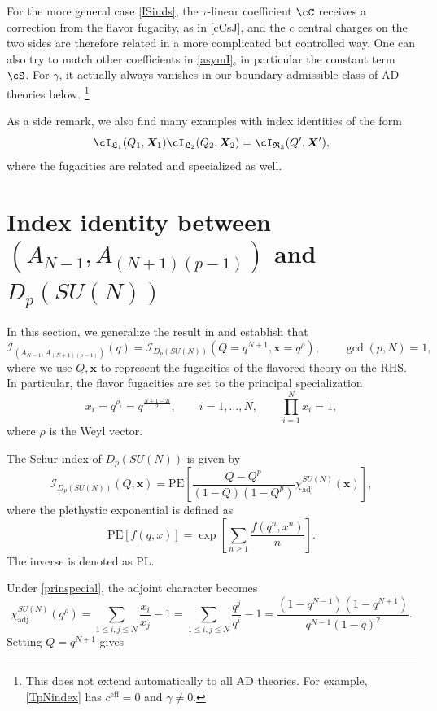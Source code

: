 \documentclass[a4paper,11pt]{article}
\theoremstyle{definition}
\theoremstyle{definition}
\theoremstyle{remark}
\newcommand{\ceff}{c^\text{eff}}
\newcommand{\be}{\begin{equation}}
\newcommand{\ee}{\end{equation}}
\begin{document}
For the more general case \eqref{ISinds}, the $\tau$-linear   coefficient $\cC$ receives a correction from the flavor fugacity, as in \eqref{cCsJ}, and the $c$ central charges on the two sides are therefore related
in a more complicated but controlled way.  
One can also try to match other coefficients in \eqref{asymI}, in particular the  constant term $\cS$.  For $\gamma$,   it actually always vanishes in our boundary admissible class of AD theories below.  \footnote{This   does not extend automatically to all AD theories. For example, \eqref{TpNindex} has $\ceff=0$ and  $\gamma\neq 0$.}
 

 

%  
%  
  
  
As a side remark, we also find many examples with index identities of the form  
  \be
\cI_{\mathfrak{L}_1}(Q_1 , \bm X _1)\cI_{\mathfrak{L}_2}(Q _2, \bm X _2)=\cI_{\mathfrak{R}_3}(Q', \bm X'),
 \ee
 where the fugacities are   related and specialized as well. 
 
\section{Index identity between $(A_{N-1},A_{(N+1)(p-1)}) $ and $D_p(SU(N))$} \label{ANDNSFs}
In this section, we generalize the result in  \cite{Adamovic:2025efe} and establish that
\be
\mathcal{I}_{(A_{N-1},A_{(N+1)(p-1)})}(q) = \mathcal{I}_{D_p(SU(N))}(Q = q^{N+1}, \bm{x} = q^\rho), \qquad
 \gcd(p,N)=1,
\ee
where we use   $Q,\bm x$ to represent the fugacities of the flavored theory on the RHS. In particular, the  flavor fugacities are set  to the    principal  specialization 
 \be\label{prinspecial}
x_i =q^{\rho_i}= q^{\frac{N+1-2i}{2}}, \qquad i = 1,\dots,N, \qquad \prod_{i=1}^N x_i = 1,
\ee 
where $\rho$ is the Weyl vector. 
 


The Schur index of $D_p(SU(N))$ is given by
\be
\mathcal{I}_{D_p(SU(N))}(Q, \bm x) = \mathrm{PE} \left[ \frac{Q - Q^p}{(1 - Q)(1 - Q^p)} \chi^{SU(N)}_{\mathrm{adj}}(\bm x) \right],
\ee
where the plethystic exponential  is  defined as
\be
\mathrm{PE}[f(q,x)] = \exp\left[ \sum_{n \ge 1} \frac{f(q^n, x^n)}{n} \right].
\ee
The inverse is denoted as $ \mathrm{PL}$.

 
 Under \eqref{prinspecial}, the adjoint character becomes 
\be
\chi^{SU(N)}_{\mathrm{adj}}(q^\rho) = \sum_{1\le i, j\le N} \frac{x_i}{x_j}-1= \sum_{1\le i, j\le N} \frac{q^j}{q^i}-1
=  \frac{(1 - q^{N-1})(1 - q^{N+1})}{q^{N-1}(1 - q)^2}  .
\ee
Setting $ Q = q^{N+1}$ gives
\end{document}
